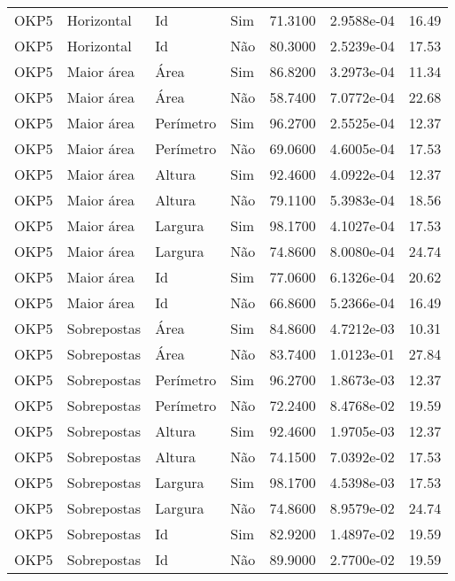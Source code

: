 \begin{tabular}{llllrrr}
    OKP5      & Horizontal  & Id        & Sim         & 71.3100      & 2.9588e-04 & 16.49    \\
    OKP5      & Horizontal  & Id        & Não         & 80.3000      & 2.5239e-04 & 17.53    \\
    OKP5      & Maior área  & Área      & Sim         & 86.8200      & 3.2973e-04 & 11.34    \\
    OKP5      & Maior área  & Área      & Não         & 58.7400      & 7.0772e-04 & 22.68    \\
    OKP5      & Maior área  & Perímetro & Sim         & 96.2700      & 2.5525e-04 & 12.37    \\
    OKP5      & Maior área  & Perímetro & Não         & 69.0600      & 4.6005e-04 & 17.53    \\
    OKP5      & Maior área  & Altura    & Sim         & 92.4600      & 4.0922e-04 & 12.37    \\
    OKP5      & Maior área  & Altura    & Não         & 79.1100      & 5.3983e-04 & 18.56    \\
    OKP5      & Maior área  & Largura   & Sim         & 98.1700      & 4.1027e-04 & 17.53    \\
    OKP5      & Maior área  & Largura   & Não         & 74.8600      & 8.0080e-04 & 24.74    \\
    OKP5      & Maior área  & Id        & Sim         & 77.0600      & 6.1326e-04 & 20.62    \\
    OKP5      & Maior área  & Id        & Não         & 66.8600      & 5.2366e-04 & 16.49    \\
    OKP5      & Sobrepostas & Área      & Sim         & 84.8600      & 4.7212e-03 & 10.31    \\
    OKP5      & Sobrepostas & Área      & Não         & 83.7400      & 1.0123e-01 & 27.84    \\
    OKP5      & Sobrepostas & Perímetro & Sim         & 96.2700      & 1.8673e-03 & 12.37    \\
    OKP5      & Sobrepostas & Perímetro & Não         & 72.2400      & 8.4768e-02 & 19.59    \\
    OKP5      & Sobrepostas & Altura    & Sim         & 92.4600      & 1.9705e-03 & 12.37    \\
    OKP5      & Sobrepostas & Altura    & Não         & 74.1500      & 7.0392e-02 & 17.53    \\
    OKP5      & Sobrepostas & Largura   & Sim         & 98.1700      & 4.5398e-03 & 17.53    \\
    OKP5      & Sobrepostas & Largura   & Não         & 74.8600      & 8.9579e-02 & 24.74    \\
    OKP5      & Sobrepostas & Id        & Sim         & 82.9200      & 1.4897e-02 & 19.59    \\
    OKP5      & Sobrepostas & Id        & Não         & 89.9000      & 2.7700e-02 & 19.59    \\
    \hline
\end{tabular}
